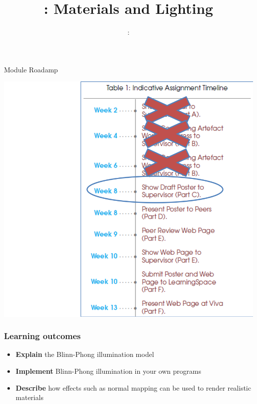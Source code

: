 \usepackage{../../beamerthemeFalmouthGamesAcademy}
\usepackage{multimedia}
\graphicspath{ {../../} }




\usepackage[normalem]{ulem}
\usepackage{wasysym}

\usepackage{pdfpages}

\usetikzlibrary{arrows,automata}




\title{\sessionnumber: Materials and Lighting}
\subtitle{\modulecode: \moduletitle}

\frame{\titlepage} 

\begin{frame}{Module Roadamp}
	\begin{center}
			\includegraphics[height=0.8\textheight]{2020-21-COMP220-roadmap}
	\end{center}
\end{frame}

\begin{frame}
	\frametitle{Learning outcomes}
	\begin{itemize}
		\item \textbf{Explain} the Blinn-Phong illumination model
		\item \textbf{Implement} Blinn-Phong illumination in your own programs
		\item \textbf{Describe} how effects such as normal mapping can be used to render realistic materials
	\end{itemize}
\end{frame}






